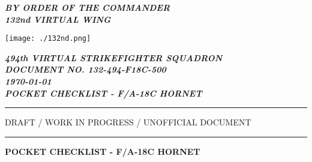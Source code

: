 \begin{titlepage}
	\begin{center}

        \begin{flushleft}
          \small
          \textbf{\textit{BY ORDER OF THE COMMANDER\\132nd VIRTUAL WING\\}}
        \end{flushleft}

        \begin{flushleft}
        	\texttt{[image: ./132nd.png]}
        \end{flushleft}
        
        \vspace*{-5.6cm}
        
        \begin{flushright}
          \small
          \textbf{\textit{494th VIRTUAL STRIKEFIGHTER SQUADRON}}\\
          \textbf{\textit{DOCUMENT NO. 132-494-F18C-500}}\\
          \vspace*{2.6cm}
          \textbf{\textit{\today}}\\
          \textbf{\textit{POCKET CHECKLIST - F/A-18C HORNET}}\\
        \end{flushright}
        
        \vspace*{0.35cm}
        
        \hrule
       	    
        \vspace{.5cm}
        
        \begin{center}
          \small
          \large{
            DRAFT / WORK IN PROGRESS / UNOFFICIAL DOCUMENT
          }        
        \end{center}

        \vspace{.5cm}

        \hrule

        \vspace{1.5cm}

        \begin{center}
          \small
          \LARGE{
            \textbf{POCKET CHECKLIST - F/A-18C HORNET}
          }
        \end{center}


\end{center}
\end{titlepage}
